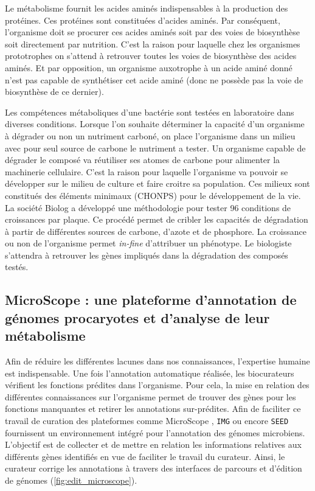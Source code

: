 \begin{refsegment}
    Le métabolisme fournit les acides aminés indispensables à la production des protéines. Ces protéines sont constituées d’acides aminés. Par conséquent, l’organisme doit se procurer ces acides aminés soit par des voies de biosynthèse soit directement par nutrition. C’est la raison pour laquelle chez les organismes prototrophes on s’attend à retrouver toutes les voies de biosynthèse des acides aminés. Et par opposition, un organisme auxotrophe à un acide aminé donné n’est pas capable de synthétiser cet acide aminé (donc ne possède pas  la voie de biosynthèse de ce dernier).
    
    Les compétences métaboliques d'une bactérie sont testées en laboratoire dans diverses conditions. Lorsque l'on souhaite déterminer la capacité d'un organisme à dégrader ou non un nutriment carboné, on place l'organisme dans un milieu avec pour seul source de carbone le nutriment a tester. Un organisme capable de dégrader le composé va réutiliser ses atomes de carbone pour alimenter la machinerie cellulaire. C'est la raison pour laquelle l'organisme va pouvoir se développer sur le milieu de culture et faire croitre sa population. Ces milieux sont constitués des éléments minimaux (\gls{CHONPS}) pour le développement de la vie. La société Biolog \cite{bochner2009global} a développé une méthodologie pour tester 96 conditions de croissances par plaque. Ce procédé permet de cribler les capacités de dégradation à partir de différentes sources de carbone, d'azote et de phosphore. La croissance ou non de l'organisme permet \textit{in-fine} d'attribuer un phénotype. Le biologiste s'attendra à retrouver les gènes impliqués dans la dégradation des composés testés.
    
    \subsection{MicroScope : une plateforme d’annotation de génomes procaryotes et d’analyse de leur métabolisme}
    
    Afin de réduire les différentes lacunes dans nos connaissances, l'expertise humaine est indispensable. Une fois l'annotation automatique réalisée, les biocurateurs vérifient les fonctions prédites dans l'organisme. Pour cela, la mise en relation des différentes connaissances sur l'organisme permet de trouver des gènes pour les fonctions manquantes et retirer les annotations sur-prédites. Afin de faciliter ce travail de curation des plateformes comme MicroScope \cite{vallenet2016microscope,Belda2017}, \texttt{\gls{IMG}} \cite{markowitz2009img,markowitz2012img} ou encore \texttt{SEED} \cite{overbeek2004seed,overbeek2014seed} fournissent un environnement intégré pour l'annotation des génomes microbiens. L'objectif est de collecter et de mettre en relation les informations relatives aux différents gènes identifiés en vue de faciliter le travail du curateur. Ainsi, le curateur corrige les annotations à travers des interfaces de parcours et d'édition de génomes (\cref{fig:edit_microscope}).
    

\end{refsegment}
